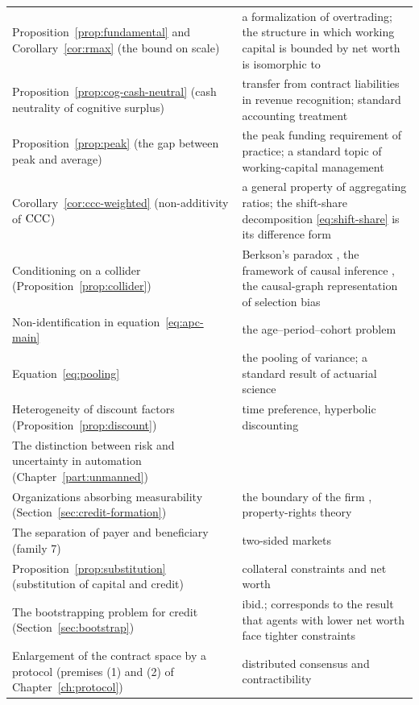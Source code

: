 \begin{longtable}{@{}>{\raggedright\arraybackslash}p{}>{\raggedright\arraybackslash}p{}@{}}
Proposition~\ref{prop:fundamental} and Corollary~\ref{cor:rmax} (the bound on scale) & a formalization of overtrading; the structure in which working capital is bounded by net worth is isomorphic to \cite{kiyotaki1997} \\
Proposition~\ref{prop:cog-cash-neutral} (cash neutrality of cognitive surplus) & transfer from contract liabilities in revenue recognition; standard accounting treatment \\
Proposition~\ref{prop:peak} (the gap between peak and average) & the peak funding requirement of practice; a standard topic of working-capital management \\
Corollary~\ref{cor:ccc-weighted} (non-additivity of $\mathrm{CCC}$) & a general property of aggregating ratios; the shift-share decomposition \eqref{eq:shift-share} is its difference form \\
Conditioning on a collider (Proposition~\ref{prop:collider}) & Berkson's paradox \cite{berkson1946}, the framework of causal inference \cite{pearl2009}, the causal-graph representation of selection bias \cite{hernan2004} \\
Non-identification in equation~\eqref{eq:apc-main} & the age--period--cohort problem \cite{mason1985} \\
Equation~\eqref{eq:pooling} & the pooling of variance; a standard result of actuarial science \\
Heterogeneity of discount factors (Proposition~\ref{prop:discount}) & time preference, hyperbolic discounting \cite{laibson1997} \\
The distinction between risk and uncertainty in automation (Chapter~\ref{part:unmanned}) & \cite{knight1921} \\
Organizations absorbing measurability (Section~\ref{sec:credit-formation}) & the boundary of the firm \cite{coase1937}, property-rights theory \cite{grossman1986} \\
The separation of payer and beneficiary (family 7) & two-sided markets \cite{rochet2003} \\
Proposition~\ref{prop:substitution} (substitution of capital and credit) & collateral constraints and net worth \cite{kiyotaki1997,rampini2010,rampini2013} \\
The bootstrapping problem for credit (Section~\ref{sec:bootstrap}) & ibid.; corresponds to the result that agents with lower net worth face tighter constraints \\
Enlargement of the contract space by a protocol (premises (1) and (2) of Chapter~\ref{ch:protocol}) & distributed consensus and contractibility \cite{cong2019} \\

\end{longtable}
